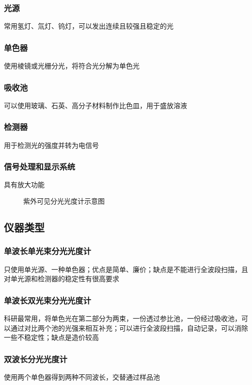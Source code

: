 \subsubsection*{光源}%
\label{subsub*:光源}
常用氢灯、氚灯、钨灯，可以发出连续且较强且稳定的光
\subsubsection*{单色器}%
\label{subsub*:单色器}
使用棱镜或光栅分光，将符合光分解为单色光
\subsubsection*{吸收池}%
\label{subsub*:吸收池}
可以使用玻璃、石英、高分子材料制作比色皿，用于盛放溶液
\subsubsection*{检测器}%
\label{subsub*:检测器}
用于检测光的强度并转为电信号
\subsubsection*{信号处理和显示系统}%
\label{subsub*:信号处理和显示系统}
具有放大功能
\begin{figure}[ht!]
    \centering
    \caption{紫外可见分光光度计示意图}
    \label{fig:紫外可见分光光度计示意图}
\end{figure}
\subsection{仪器类型}%
\label{sub:仪器类型}
\subsubsection*{单波长单光束分光光度计}%
\label{subsub*:单波长单光束分光光度计}
只使用单光源、一种单色器；优点是简单、廉价；缺点是不能进行全波段扫描，且对单光源和检测器的稳定性有很高要求
\subsubsection*{单波长双光束分光光度计}%
\label{subsub*:单波长双光束分光光度计}
科研最常用，将单色光在第二部分为两束，一份透过参比池，一份经过吸收池，可以通过对比两个池的光强来相互补充；可以进行全波段扫描，自动记录，可以消除一些不稳定性；缺点是造价较高
\subsubsection*{双波长分光光度计}%
\label{subsub*:双波长分光光度计}
使用两个单色器得到两种不同波长，交替通过样品池
